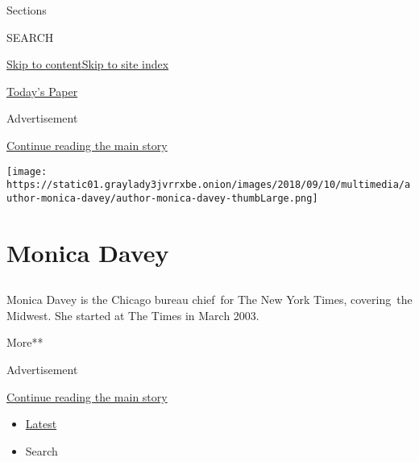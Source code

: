 Sections

SEARCH

\protect\hyperlink{site-content}{Skip to
content}\protect\hyperlink{site-index}{Skip to site index}

\href{https://myaccount.nytimes3xbfgragh.onion/auth/login?response_type=cookie\&client_id=vi}{}

\href{https://www.nytimes3xbfgragh.onion/section/todayspaper}{Today's
Paper}

Advertisement

\protect\hyperlink{after-top}{Continue reading the main story}

\texttt{[image: https://static01.graylady3jvrrxbe.onion/images/2018/09/10/multimedia/author-monica-davey/author-monica-davey-thumbLarge.png]}

\hypertarget{monica-davey}{%
\section{Monica Davey}\label{monica-davey}}

\subsection{}

Monica Davey is the Chicago bureau chief~for The New York Times,
covering~the Midwest. She started at The Times in March 2003.

More**

Advertisement

\protect\hyperlink{after-mid1}{Continue reading the main story}

\begin{itemize}
\tightlist
\item
  \protect\hyperlink{stream-panel}{Latest}
\item
  Search
\end{itemize}


